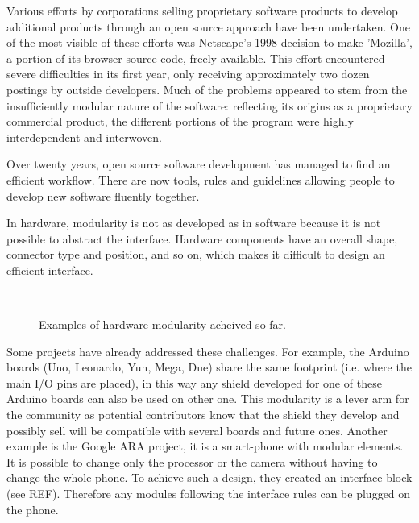 Various efforts by corporations selling proprietary software products to develop additional products through an open source approach have been undertaken. One of the most visible of these efforts was Netscape's 1998 decision to make 'Mozilla', a portion of its browser source code, freely available. This effort encountered severe difficulties in its first year, only receiving approximately two dozen postings by outside developers. Much of the problems appeared to stem from the insufficiently modular nature of the software: reflecting its origins as a proprietary commercial product, the different portions of the program were highly interdependent and interwoven.

Over twenty years, open source software development has managed to find an efficient workflow. There are now tools, rules and guidelines allowing people to develop new software fluently together.

In hardware, modularity is not as developed as in software because it is not possible to abstract the interface. Hardware components have an overall shape, connector type and position, and so on, which makes it difficult to design an efficient interface.

\begin{figure}[tb]
\centering
    \hfil
     \\
    \caption{Examples of hardware modularity acheived so far.}
    \label{fig:hardware-modularity}
\end{figure}

Some projects have already addressed these challenges. For example, the Arduino boards (Uno, Leonardo, Yun, Mega, Due) share the same footprint (i.e. where the main I/O pins are placed), in this way any shield developed for one of these Arduino boards can also be used on other one. This modularity is a lever arm for the community as potential contributors know that the shield they develop and possibly sell will be compatible with several boards and future ones.
Another example is the Google ARA project, it is a smart-phone with modular elements. It is possible to change only the processor or the camera without having to change the whole phone. To achieve such a design, they created an interface block (see REF). Therefore any modules following the interface rules can be plugged on the phone.


